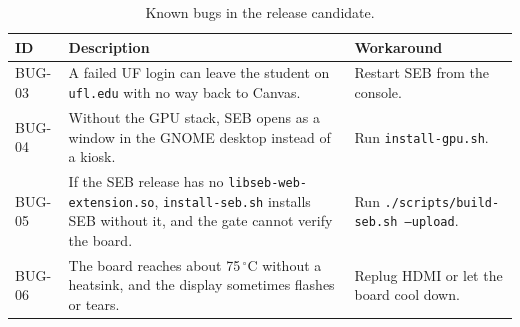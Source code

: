 \documentclass[11pt]{article}
\begin{document}
\begin{table}[H]
  \centering
  \footnotesize
  \begin{tabularx}{\textwidth}{@{}p{}X p{}@{}}
    \toprule
    \textbf{ID} & \textbf{Description} & \textbf{Workaround} \\
    \midrule
    BUG-03 &
    A failed UF login can leave the student on \texttt{ufl.edu} with no way back to Canvas. &
    Restart SEB from the console. \\
    BUG-04 &
    Without the GPU stack, SEB opens as a window in the GNOME desktop instead of a kiosk. &
    Run \texttt{install-gpu.sh}. \\
    BUG-05 &
    If the SEB release has no \texttt{libseb-web-extension.so}, \texttt{install-seb.sh} installs SEB without it, and the gate cannot verify the board. &
    Run \texttt{./scripts/build-seb.sh --upload}. \\
    BUG-06 &
    The board reaches about 75\,$^\circ$C without a heatsink, and the display sometimes flashes or tears. &
    Replug HDMI or let the board cool down. \\
    \bottomrule
  \end{tabularx}
  \caption{Known bugs in the release candidate.}
  \label{tab:bugs}
\end{table}
\end{document}

